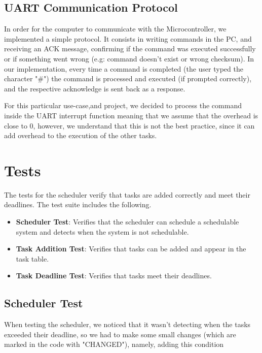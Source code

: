 \documentclass[a4paper,12pt]{article}
\begin{document}
\subsection{UART Communication Protocol}
In order for the computer to communicate with the Microcontroller, we implemented a simple protocol. It consists in writing commands in the PC, and receiving an ACK message, confirming if the command was executed successfully or if something went wrong (e.g: command doesn't exist or wrong checksum).
In our implementation, every time a command is completed (the user typed the character "\#") the command is processed and executed (if prompted correctly), and the respective acknowledge is sent back as a response.

For this particular use-case,and project, we decided to process the command inside the UART interrupt function meaning that we assume that the overhead is close to 0, however, we understand that this is not the best practice, since it can add overhead to the execution of the other tasks.

\section{Tests}
The tests for the scheduler verify that tasks are added correctly and meet their deadlines. The test suite includes the following.
\begin{itemize}
    \item \textbf{Scheduler Test}: Verifies that the scheduler can schedule a schedulable system and detects when the system is not schedulable.
    \item \textbf{Task Addition Test}: Verifies that tasks can be added and appear in the task table.
    \item \textbf{Task Deadline Test}: Verifies that tasks meet their deadlines.
\end{itemize}

\subsection{Scheduler Test}
When testing the scheduler, we noticed that it wasn't detecting when the tasks exceeded their deadline, so we had to make some small changes (which are marked in the code with "CHANGED"), namely, adding this condition
\begin{figure}[H]
    \centering
    \label{fig:gantt}
\end{figure}
\end{document}
